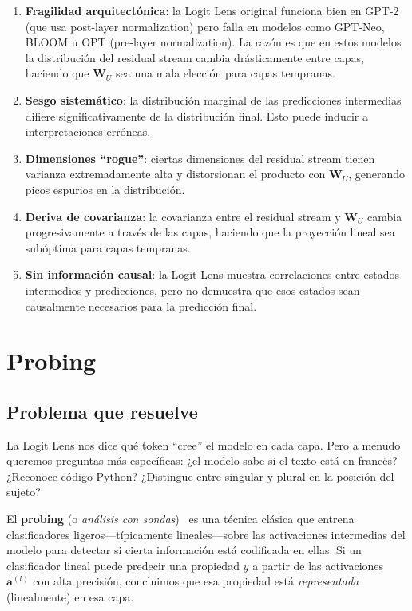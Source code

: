 \documentclass[11pt,a4paper]{report}
\theoremstyle{definition}
\begin{document}
\begin{enumerate}
    \item \textbf{Fragilidad arquitectónica}: la Logit Lens original funciona bien en GPT-2 (que usa post-layer normalization) pero falla en modelos como GPT-Neo, BLOOM u OPT (pre-layer normalization). La razón es que en estos modelos la distribución del residual stream cambia drásticamente entre capas, haciendo que $\mathbf{W}_U$ sea una mala elección para capas tempranas.
    \item \textbf{Sesgo sistemático}: la distribución marginal de las predicciones intermedias difiere significativamente de la distribución final. Esto puede inducir a interpretaciones erróneas.
    \item \textbf{Dimensiones ``rogue''}: ciertas dimensiones del residual stream tienen varianza extremadamente alta y distorsionan el producto con $\mathbf{W}_U$, generando picos espurios en la distribución.
    \item \textbf{Deriva de covarianza}: la covarianza entre el residual stream y $\mathbf{W}_U$ cambia progresivamente a través de las capas, haciendo que la proyección lineal sea subóptima para capas tempranas.
    \item \textbf{Sin información causal}: la Logit Lens muestra correlaciones entre estados intermedios y predicciones, pero no demuestra que esos estados sean causalmente necesarios para la predicción final.
\end{enumerate}

\newpage

\chapter{Probing}
\label{ch:probing}

\section{Problema que resuelve}

La Logit Lens nos dice qué token ``cree'' el modelo en cada capa. Pero a menudo queremos preguntas más específicas: ¿el modelo sabe si el texto está en francés? ¿Reconoce código Python? ¿Distingue entre singular y plural en la posición del sujeto?

El \textbf{probing} (o \emph{análisis con sondas})~\cite{alain2016probing} es una técnica clásica que entrena clasificadores ligeros---típicamente lineales---sobre las activaciones intermedias del modelo para detectar si cierta información está codificada en ellas. Si un clasificador lineal puede predecir una propiedad $y$ a partir de las activaciones $\mathbf{a}^{(l)}$ con alta precisión, concluimos que esa propiedad está \emph{representada} (linealmente) en esa capa.
\end{document}
